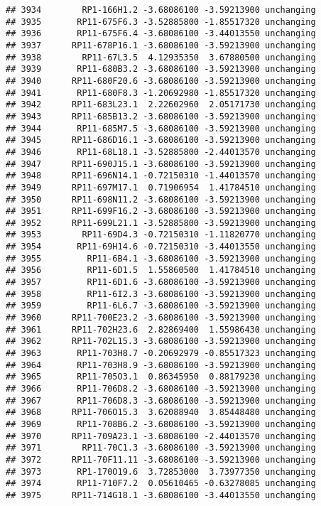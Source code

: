 \documentclass[]{article}
\begin{document}
\begin{verbatim}
## 3934        RP1-166H1.2 -3.68086100 -3.59213900 unchanging
## 3935       RP11-675F6.3 -3.52885800 -1.85517320 unchanging
## 3936       RP11-675F6.4 -3.68086100 -3.44013550 unchanging
## 3937      RP11-678P16.1 -3.68086100 -3.59213900 unchanging
## 3938        RP11-67L3.5  4.12935350  3.67880500 unchanging
## 3939       RP11-680B3.2 -3.68086100 -3.59213900 unchanging
## 3940      RP11-680F20.6 -3.68086100 -3.59213900 unchanging
## 3941       RP11-680F8.3 -1.20692980 -1.85517320 unchanging
## 3942      RP11-683L23.1  2.22602960  2.05171730 unchanging
## 3943      RP11-685B13.2 -3.68086100 -3.59213900 unchanging
## 3944       RP11-685M7.5 -3.68086100 -3.59213900 unchanging
## 3945      RP11-686D16.1 -3.68086100 -3.59213900 unchanging
## 3946       RP11-68L18.1 -3.52885800 -2.44013570 unchanging
## 3947      RP11-690J15.1 -3.68086100 -3.59213900 unchanging
## 3948      RP11-696N14.1 -0.72150310 -1.44013570 unchanging
## 3949      RP11-697M17.1  0.71906954  1.41784510 unchanging
## 3950      RP11-698N11.2 -3.68086100 -3.59213900 unchanging
## 3951      RP11-699F16.2 -3.68086100 -3.59213900 unchanging
## 3952      RP11-699L21.1 -3.52885800 -3.59213900 unchanging
## 3953        RP11-69D4.3 -0.72150310 -1.11820770 unchanging
## 3954       RP11-69H14.6 -0.72150310 -3.44013550 unchanging
## 3955         RP11-6B4.1 -3.68086100 -3.59213900 unchanging
## 3956         RP11-6D1.5  1.55860500  1.41784510 unchanging
## 3957         RP11-6D1.6 -3.68086100 -3.59213900 unchanging
## 3958         RP11-6I2.3 -3.68086100 -3.59213900 unchanging
## 3959         RP11-6L6.7 -3.68086100 -3.59213900 unchanging
## 3960      RP11-700E23.2 -3.68086100 -3.59213900 unchanging
## 3961      RP11-702H23.6  2.82869400  1.55986430 unchanging
## 3962      RP11-702L15.3 -3.68086100 -3.59213900 unchanging
## 3963       RP11-703H8.7 -0.20692979 -0.85517323 unchanging
## 3964       RP11-703H8.9 -3.68086100 -3.59213900 unchanging
## 3965       RP11-705O3.1  0.86345950  0.88179230 unchanging
## 3966       RP11-706D8.2 -3.68086100 -3.59213900 unchanging
## 3967       RP11-706D8.3 -3.68086100 -3.59213900 unchanging
## 3968      RP11-706O15.3  3.62088940  3.85448480 unchanging
## 3969       RP11-708B6.2 -3.68086100 -3.59213900 unchanging
## 3970      RP11-709A23.1 -3.68086100 -2.44013570 unchanging
## 3971        RP11-70C1.3 -3.68086100 -3.59213900 unchanging
## 3972      RP11-70F11.11 -3.68086100 -3.59213900 unchanging
## 3973       RP1-170O19.6  3.72853000  3.73977350 unchanging
## 3974       RP11-710F7.2  0.05610465 -0.63278085 unchanging
## 3975      RP11-714G18.1 -3.68086100 -3.44013550 unchanging

\end{verbatim}
\end{document}
